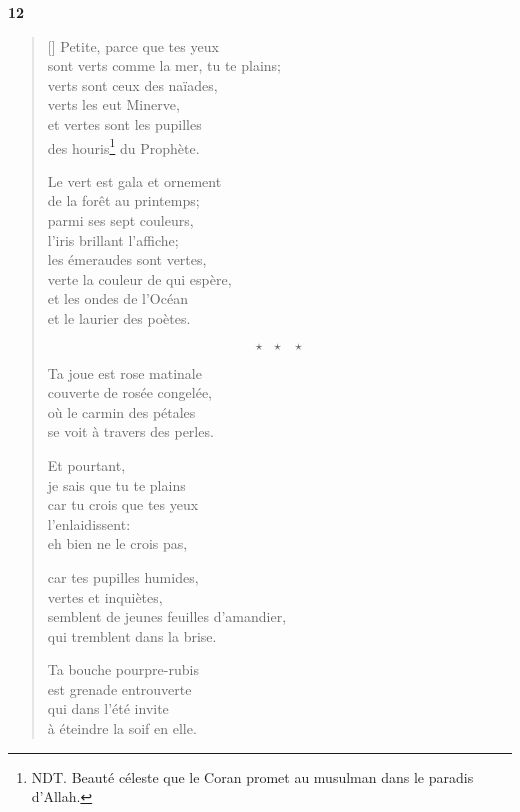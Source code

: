 \documentclass[a4paper,12pt]{book}
\begin{document}
\bigskip

\begin{center}
  \textbf{12}
\end{center}

\settowidth{\versewidth}{Petite, parce que tes yeux}

\begin{verse}[\versewidth]
  Petite, parce que tes yeux \\
  sont verts comme la mer, tu te plains; \\
  verts sont ceux des naïades, \\
  verts les eut Minerve, \\
  et vertes sont les pupilles \\
  des houris\footnote{NDT. Beauté céleste que le Coran promet au musulman dans le paradis d'Allah.} du Prophète.

  Le vert est gala et ornement \\
  de la forêt au printemps; \\
  parmi ses sept couleurs, \\
  l'iris brillant l'affiche; \\
  les émeraudes sont vertes, \\
  verte la couleur de qui espère, \\
  et les ondes de l'Océan \\
  et le laurier des poètes.

  $$\star \ \ \ \star \ \ \ \star$$

  Ta joue est rose matinale \\
  couverte de rosée congelée, \\
  où le carmin des pétales \\
  se voit à travers des perles.

  Et pourtant, \\
  je sais que tu te plains \\
  car tu crois que tes yeux \\
  l'enlaidissent: \\
  eh bien ne le crois pas,

  car tes pupilles humides, \\
  vertes et inquiètes, \\
  semblent de jeunes feuilles d'amandier, \\
  qui tremblent dans la brise.

  Ta bouche pourpre-rubis \\
  est grenade entrouverte \\
  qui dans l'été invite \\
  à éteindre la soif en elle.


\end{verse}
\end{document}
